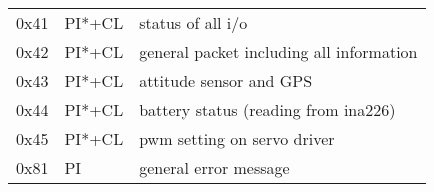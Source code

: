\documentclass[a4paper,12pt]{report}
\begin{document}
\begin{center}
  \begin{longtable}{| m{1cm} | m{1.5cm} | m{13cm} | }
    \hline
    0x41 & PI*+CL & status of all i/o                        \\
    0x42 & PI*+CL & general packet including all information \\
    0x43 & PI*+CL & attitude sensor and GPS                  \\
    0x44 & PI*+CL & battery status (reading from ina226)     \\
    0x45 & PI*+CL & pwm setting on servo driver              \\
    0x81 & PI     & general error message                    \\
    \hline
  \end{longtable}
\end{center}
\end{document}
